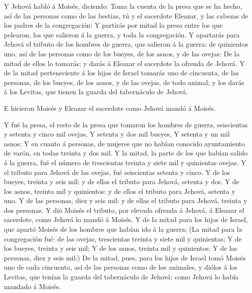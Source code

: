  Y Jehová habló á Moisés, diciendo:  Toma
la cuenta de la presa que se ha hecho, así de las personas como de las
bestias, tú y el sacerdote Eleazar, y las cabezas de los padres de la
congregación:  Y partirás por mitad la presa entre los
que pelearon, los que salieron á la guerra, y toda la congregación.
 Y apartarás para Jehová el tributo de los hombres de
guerra, que salieron á la guerra: de quinientos uno, así de las personas
como de los bueyes, de los asnos, y de las ovejas:  De la
mitad de ellos lo tomarás; y darás á Eleazar el sacerdote la ofrenda de
Jehová.  Y de la mitad perteneciente á los hijos de
Israel tomarás uno de cincuenta, de las personas, de los bueyes, de los
asnos, y de las ovejas, de todo animal; y los darás á los Levitas, que
tienen la guarda del tabernáculo de Jehová.

 E hicieron Moisés y Eleazar el sacerdote como Jehová
mandó á Moisés.

 Y fué la presa, el resto de la presa que tomaron los
hombres de guerra, seiscientas y setenta y cinco mil ovejas,
 Y setenta y dos mil bueyes,  Y setenta y
un mil asnos;  Y en cuanto á personas, de mujeres que no
habían conocido ayuntamiento de varón, en todas treinta y dos mil.
 Y la mitad, la parte de los que habían salido á la
guerra, fué el número de trescientas treinta y siete mil y quinientas
ovejas.  Y el tributo para Jehová de las ovejas, fué
seiscientas setenta y cinco.  Y de los bueyes, treinta y
seis mil: y de ellos el tributo para Jehová, setenta y dos.
 Y de los asnos, treinta mil y quinientos: y de ellos el
tributo para Jehová, setenta y uno.  Y de las personas,
diez y seis mil: y de ellas el tributo para Jehová, treinta y dos
personas.  Y dió Moisés el tributo, por elevada ofrenda á
Jehová, á Eleazar el sacerdote, como Jehová lo mandó á Moisés.
 Y de la mitad para los hijos de Israel, que apartó
Moisés de los hombres que habían ido á la guerra;  (La
mitad para la congregación fué: de las ovejas, trescientas treinta y
siete mil y quinientas;  Y de los bueyes, treinta y seis
mil;  Y de los asnos, treinta mil y quinientos;
 Y de las personas, diez y seis mil:)  De
la mitad, pues, para los hijos de Israel tomó Moisés uno de cada
cincuenta, así de las personas como de los animales, y diólos á los
Levitas, que tenían la guarda del tabernáculo de Jehová; como Jehová lo
había mandado á Moisés.

